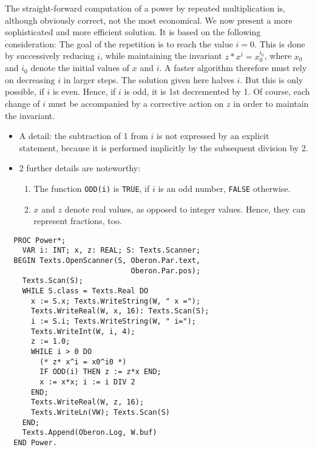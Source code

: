 The straight-forward computation of a power by repeated multiplication is, although obviously
correct, not the most economical. We now present a more sophisticated and more efficient solution.
It is based on the following consideration: The goal of the repetition is to reach the value $i = 0$.
This is done by successively reducing $i$, while maintaining the invariant $z * x^i = x_0^{i_0}$,
where $x_0$ and $i_0$ denote the initial values of $x$ and $i$. A faster algorithm therefore must
rely on decreasing $i$ in larger steps. The solution given here halves $i$. But this is only possible,
if $i$ is even. Hence, if $i$ is odd, it is 1st decremented by 1. Of course, each change of $i$ must
be accompanied by a corrective action on $z$ in order to maintain the invariant.
\begin{itemize}
  \item A detail: the subtraction of 1 from $i$ is not expressed by an explicit statement, because
    it is performed implicitly by the subsequent division by 2.
  \item 2 further details are noteworthy:
  \begin{enumerate}
    \item The function \verb|ODD(i)| is \verb|TRUE|, if $i$ is an odd number, \verb|FALSE| otherwise.
    \item $x$ and $z$ denote real values, as opposed to integer values. Hence, they can represent
      fractions, too.
  \end{enumerate}
\end{itemize}
\begin{verbatim}
  PROC Power*;
    VAR i: INT; x, z: REAL; S: Texts.Scanner;
  BEGIN Texts.OpenScanner(S, Oberon.Par.text,
                             Oberon.Par.pos);
    Texts.Scan(S);
    WHILE S.class = Texts.Real DO
      x := S.x; Texts.WriteString(W, " x =");
      Texts.WriteReal(W, x, 16): Texts.Scan(S);
      i := S.i; Texts.WriteString(W, " i=");
      Texts.WriteInt(W, i, 4);
      z := 1.0;
      WHILE i > 0 DO
        (* z* x^i = x0^i0 *)
        IF ODD(i) THEN z := z*x END;
        x := x*x; i := i DIV 2
      END;
      Texts.WriteReal(W, z, 16);
      Texts.WriteLn(VW); Texts.Scan(S)
    END;
    Texts.Append(Oberon.Log, W.buf)
  END Power.
\end{verbatim}

